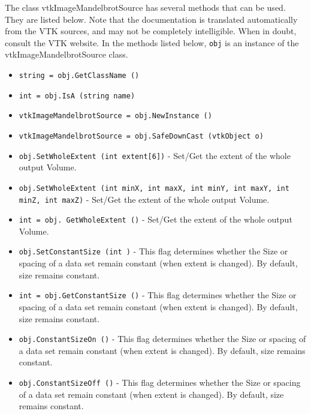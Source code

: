 The class vtkImageMandelbrotSource has several methods that can be used.
  They are listed below.
Note that the documentation is translated automatically from the VTK sources,
and may not be completely intelligible.  When in doubt, consult the VTK website.
In the methods listed below, \verb|obj| is an instance of the vtkImageMandelbrotSource class.
\begin{itemize}
\item  \verb|string = obj.GetClassName ()|

\item  \verb|int = obj.IsA (string name)|

\item  \verb|vtkImageMandelbrotSource = obj.NewInstance ()|

\item  \verb|vtkImageMandelbrotSource = obj.SafeDownCast (vtkObject o)|

\item  \verb|obj.SetWholeExtent (int extent[6])| -  Set/Get the extent of the whole output Volume.

\item  \verb|obj.SetWholeExtent (int minX, int maxX, int minY, int maxY, int minZ, int maxZ)| -  Set/Get the extent of the whole output Volume.

\item  \verb|int = obj. GetWholeExtent ()| -  Set/Get the extent of the whole output Volume.

\item  \verb|obj.SetConstantSize (int )| -  This flag determines whether the Size or spacing of 
 a data set remain constant (when extent is changed).  
 By default, size remains constant.

\item  \verb|int = obj.GetConstantSize ()| -  This flag determines whether the Size or spacing of 
 a data set remain constant (when extent is changed).  
 By default, size remains constant.

\item  \verb|obj.ConstantSizeOn ()| -  This flag determines whether the Size or spacing of 
 a data set remain constant (when extent is changed).  
 By default, size remains constant.

\item  \verb|obj.ConstantSizeOff ()| -  This flag determines whether the Size or spacing of 
 a data set remain constant (when extent is changed).  
 By default, size remains constant.


\end{itemize}
